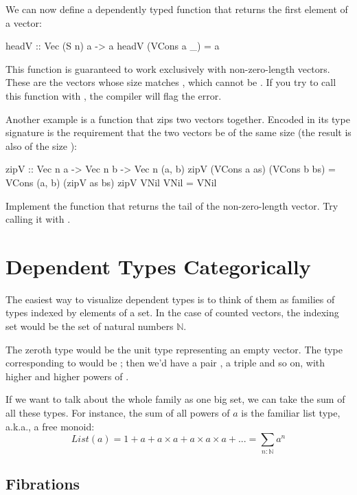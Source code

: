 \documentclass[DaoFP]{subfiles}
\begin{document}
We can now define a dependently typed function that returns the first element of a vector:
\begin{haskell}
headV :: Vec (S n) a -> a
headV (VCons a _) = a
\end{haskell}
This function is guaranteed to work exclusively with non-zero-length vectors. These are the vectors whose size matches , which cannot be . If you try to call this function with , the compiler will flag the error.

Another example is a function that zips two vectors together. Encoded in its type signature is the requirement that the two vectors be of the same size  (the result is also of the size ):
\begin{haskell}
zipV :: Vec n a -> Vec n b -> Vec n (a, b)
zipV (VCons a as) (VCons b bs) = VCons (a, b) (zipV as bs)
zipV VNil VNil = VNil
\end{haskell}

\begin{exercise}
Implement the function  that returns the tail of the non-zero-length vector. Try calling it with .
\end{exercise}

\section{Dependent Types Categorically}

The easiest way to visualize dependent types is to think of them as families of types indexed by elements of a set. In the case of counted vectors, the indexing set would be the set of natural numbers $\mathbb{N}$.

The zeroth type would be the unit type \hask{()} representing an empty vector. The type corresponding to  would be ; then we'd have a pair , a triple  and so on, with higher and higher powers of .

If we want to talk about the whole family as one big set, we can take the sum of all these types. For instance, the sum of all powers of $a$ is the familiar list type, a.k.a., a free monoid:
\[ \mathit{List} (a) = 1 + a + a \times a + a \times a \times a + ... =  \sum_{n:\mathbb{N}} a^n \]

\subsection{Fibrations}
\end{document}
